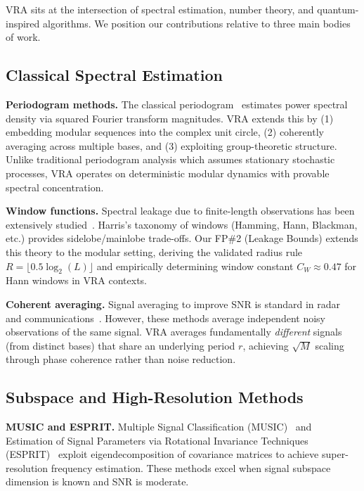 VRA sits at the intersection of spectral estimation, number theory, and quantum-inspired algorithms. We position our contributions relative to three main bodies of work.

\subsection{Classical Spectral Estimation}

\textbf{Periodogram methods.} The classical periodogram~\cite{schuster1898periodogram} estimates power spectral density via squared Fourier transform magnitudes. VRA extends this by (1) embedding modular sequences into the complex unit circle, (2) coherently averaging across multiple bases, and (3) exploiting group-theoretic structure. Unlike traditional periodogram analysis which assumes stationary stochastic processes, VRA operates on deterministic modular dynamics with provable spectral concentration.

\textbf{Window functions.} Spectral leakage due to finite-length observations has been extensively studied~\cite{harris1978windows}. Harris's taxonomy of windows (Hamming, Hann, Blackman, etc.) provides sidelobe/mainlobe trade-offs. Our FP\#2 (Leakage Bounds) extends this theory to the modular setting, deriving the validated radius rule $R = \lfloor 0.5 \log_2(L) \rfloor$ and empirically determining window constant $C_W \approx 0.47$ for Hann windows in VRA contexts.

\textbf{Coherent averaging.} Signal averaging to improve SNR is standard in radar~\cite{skolnik2001radar} and communications~\cite{proakis2007digital}. However, these methods average independent noisy observations of the same signal. VRA averages fundamentally \emph{different} signals (from distinct bases) that share an underlying period $r$, achieving $\sqrt{M}$ scaling through phase coherence rather than noise reduction.

\subsection{Subspace and High-Resolution Methods}

\textbf{MUSIC and ESPRIT.} Multiple Signal Classification (MUSIC)~\cite{schmidt1986music} and Estimation of Signal Parameters via Rotational Invariance Techniques (ESPRIT)~\cite{roy1989esprit} exploit eigendecomposition of covariance matrices to achieve super-resolution frequency estimation. These methods excel when signal subspace dimension is known and SNR is moderate.

